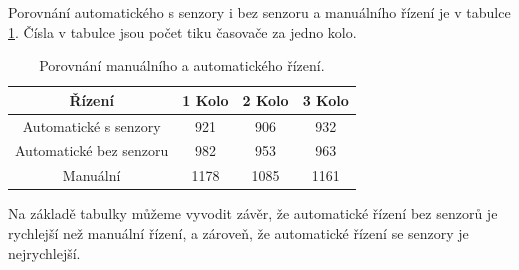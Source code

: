 Porovnání automatického s senzory i bez senzoru a manuálního řízení je v tabulce \ref{tab:Comparison}. Čísla v tabulce jsou počet tiku časovače za jedno kolo.
\begin{table}[!h]
    \centering
    \begin{tabular}{cccc}
        \hline
        \textbf{Řízení} & \textbf{1 Kolo} & \textbf{2 Kolo} & \textbf{3 Kolo} \\
        \hline
        Automatické s senzory          & 921       & 906 & 932          \\
        Automatické bez senzoru & 982 & 953 & 963 \\
        Manuální 			  & 1178       & 1085 & 1161           \\
        \hline
    \end{tabular}
    \caption{Porovnání manuálního a automatického řízení.}
    \label{tab:Comparison}
\end{table}


Na základě tabulky můžeme vyvodit závěr, že automatické řízení bez senzorů je rychlejší než manuální řízení, a zároveň, že automatické řízení se senzory je nejrychlejší.

\endinput
